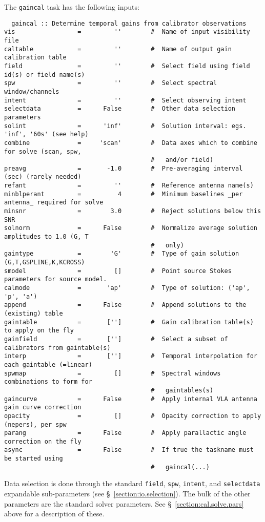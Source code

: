 The {\tt gaincal} task has the following inputs:
\small
\begin{verbatim}
  gaincal :: Determine temporal gains from calibrator observations
vis                 =         ''        #  Name of input visibility file
caltable            =         ''        #  Name of output gain calibration table
field               =         ''        #  Select field using field id(s) or field name(s)
spw                 =         ''        #  Select spectral window/channels
intent              =         ''        #  Select observing intent
selectdata          =      False        #  Other data selection parameters
solint              =      'inf'        #  Solution interval: egs. 'inf', '60s' (see help)
combine             =     'scan'        #  Data axes which to combine for solve (scan, spw,
                                        #   and/or field)
preavg              =       -1.0        #  Pre-averaging interval (sec) (rarely needed)
refant              =         ''        #  Reference antenna name(s)
minblperant         =          4        #  Minimum baselines _per antenna_ required for solve
minsnr              =        3.0        #  Reject solutions below this SNR
solnorm             =      False        #  Normalize average solution amplitudes to 1.0 (G, T
                                        #   only)
gaintype            =        'G'        #  Type of gain solution (G,T,GSPLINE,K,KCROSS)
smodel              =         []        #  Point source Stokes parameters for source model.
calmode             =       'ap'        #  Type of solution: ('ap', 'p', 'a')
append              =      False        #  Append solutions to the (existing) table
gaintable           =       ['']        #  Gain calibration table(s) to apply on the fly
gainfield           =       ['']        #  Select a subset of calibrators from gaintable(s)
interp              =       ['']        #  Temporal interpolation for each gaintable (=linear)
spwmap              =         []        #  Spectral windows combinations to form for
                                        #   gaintables(s)
gaincurve           =      False        #  Apply internal VLA antenna gain curve correction
opacity             =         []        #  Opacity correction to apply (nepers), per spw
parang              =      False        #  Apply parallactic angle correction on the fly
async               =      False        #  If true the taskname must be started using
                                        #   gaincal(...)
\end{verbatim}
\normalsize
Data selection is done through the standard {\tt field}, {\tt spw},
{\tt intent}, and 
{\tt selectdata} expandable sub-parameters (see \S~\ref{section:io.selection}).
The bulk of the other parameters are the standard solver parameters.  See
\S~\ref{section:cal.solve.pars} above for a description of these.

